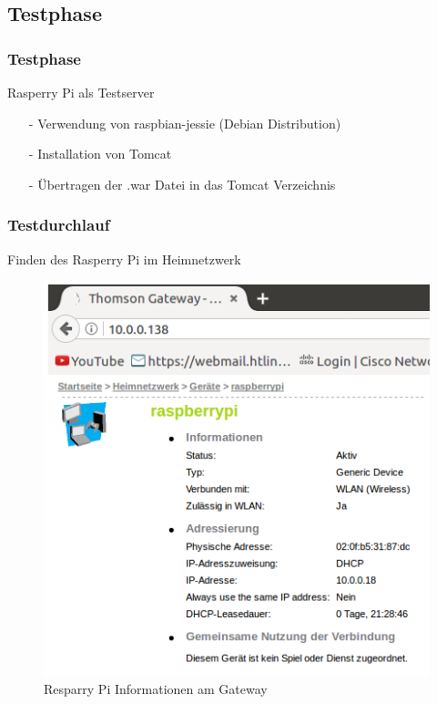 \documentclass[12pt]{beamer}
\begin{document}
\subsection{Testphase}

\begin{frame}
\frametitle{Testphase}

\begin{Large}
	Rasperry Pi als Testserver \vspace{0.2 cm}
\end{Large}
	\begin{itemize}
		\item[-] Verwendung von raspbian-jessie (Debian Distribution)
		\item[-] Installation von Tomcat 
		\item[-] Übertragen der .war Datei in das Tomcat Verzeichnis 
	\end{itemize}
\end{frame}

\subsubsection{Testdurchlauf}

\begin{frame}
	Finden des Rasperry Pi im Heimnetzwerk
	\begin{figure}
		\includegraphics[scale=0.46]{Bilder/gatewayInt.png}
		\caption{Resparry Pi Informationen am Gateway}
	\end{figure}		
\end{frame}
\end{document}

